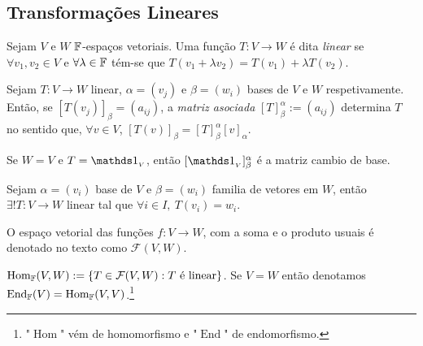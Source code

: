 \subsection*{Transformações Lineares}

\begin{definition}
    Sejam \(V\) e \(W\) \(\mathbb{F}\)-espaços vetoriais. Uma função \(T: V \to W\) é dita \emph{linear} se \(\forall v_1, v_2 \in V\) e \(\forall \lambda \in \mathbb{F} \) tém-se que \(T(v_1 + \lambda v_2) = T(v_1) + \lambda T(v_2)\). 
\end{definition}

\begin{definition}
    Sejam \(T: V \to W\) linear, \(\alpha = (v_j)\) e \(\beta = (w_i)\) bases de \(V\) e \(W \) respetivamente. Então, se \([T(v_j)]_\beta= (a_{ij})\), a \emph{matriz asociada} \([T]_\beta^\alpha := (a_{ij})\) determina \(T\) no sentido que, \(\forall v \in V\), \([T(v)]_\beta = [T]_\beta^\alpha [v]_\alpha\). 
\end{definition}

\begin{note}
    Se \(W= V \) e \(T = \id_{_V}\), então \([\id_{_V}]^\alpha_\beta\) é a matriz cambio de base. 
\end{note}

\begin{theorem}
    \label{thm:6.1.6}
    Sejam \(\alpha = (v_i)\) base de \(V\) e \(\beta = (w_i)\) familia de vetores em \(W\), então \(\exists ! T:V\to W \) linear tal que \(\forall i \in I,\ T(v_i) = w_i\). 
\end{theorem}
    
\begin{note}
    O espaço vetorial das funções \(f: V \to W\), com a soma e o produto usuais é denotado no texto como \(\mathcal{F}(V,W)\).   
\end{note}

\renewcommand{\hom}{\operatorname{Hom}_\F}
\newcommand{\ehom}{\operatorname{End}_\F}

\begin{definition}  
  \(\hom(V,W):= \{T \in \mathcal{F}(V,W): T \text{ é linear}\} \). Se \(V = W\) então denotamos \(\ehom(V) = \hom(V,V)\).\footnote{"\(\operatorname{Hom}\)" vém de homomorfismo e "\(\operatorname{End}\)" de endomorfismo.}   
\end{definition}   

